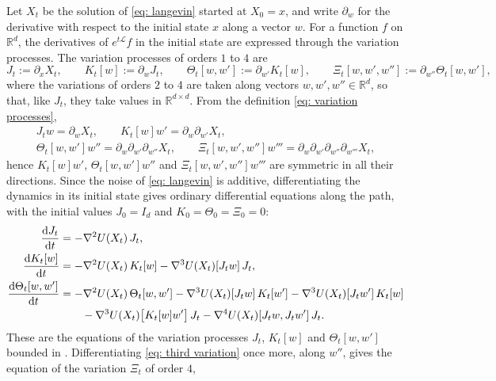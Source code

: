 Let $X_t$ be the solution of \eqref{eq: langevin} started at $X_0 = x$, and write $\partial_w$ for the derivative with respect to the initial state $x$ along a vector $w$. For a function $f$ on $\mathbb R^d$, the derivatives of $e^{t\mathcal L} f$ in the initial state are expressed through the variation processes. The variation processes of orders $1$ to $4$ are
\begin{equation}
    J_t := \partial_x X_t , \qquad
    K_t[w] := \partial_w J_t , \qquad
    \Theta_t[w,w'] := \partial_{w'} K_t[w] , \qquad
    \Xi_t[w,w',w''] := \partial_{w''} \Theta_t[w,w'] ,
    \label{eq: variation processes}
\end{equation}
where the variations of orders $2$ to $4$ are taken along vectors $w, w', w'' \in \mathbb R^d$, so that, like $J_t$, they take values in $\mathbb R^{d \times d}$. From the definition \eqref{eq: variation processes},
\begin{equation*}
\begin{gathered}
    J_t w = \partial_w X_t , \qquad K_t[w] w' = \partial_w \partial_{w'} X_t , \\
    \Theta_t[w,w'] w'' = \partial_w \partial_{w'} \partial_{w''} X_t , \qquad \Xi_t[w,w',w''] w''' = \partial_w \partial_{w'} \partial_{w''} \partial_{w'''} X_t ,
\end{gathered}
\end{equation*}
hence $K_t[w] w'$, $\Theta_t[w,w'] w''$ and $\Xi_t[w,w',w''] w'''$ are symmetric in all their directions. Since the noise of \eqref{eq: langevin} is additive, differentiating the dynamics in its initial state gives ordinary differential equations along the path, with the initial values $J_0 = I_d$ and $K_0 = \Theta_0 = \Xi_0 = 0$:
\begin{align}
    \frac{\mathrm{d} J_t}{\mathrm{d} t} &= -\nabla^2 U(X_t)\, J_t , \label{eq: first variation}\\
    \frac{\mathrm{d} K_t[w]}{\mathrm{d} t} &= -\nabla^2 U(X_t)\, K_t[w] - \nabla^3 U(X_t)[J_t w]\, J_t , \label{eq: second variation}\\
    \frac{\mathrm{d} \Theta_t[w,w']}{\mathrm{d} t} &= -\nabla^2 U(X_t)\, \Theta_t[w,w'] - \nabla^3 U(X_t)[J_t w]\, K_t[w'] - \nabla^3 U(X_t)[J_t w']\, K_t[w] \notag\\
    &\qquad - \nabla^3 U(X_t)\bigl[ K_t[w] w' \bigr]\, J_t - \nabla^4 U(X_t)[J_t w, J_t w']\, J_t . \label{eq: third variation}
\end{align}
These are the equations of the variation processes $J_t$, $K_t[w]$ and $\Theta_t[w,w']$ bounded in \citep[Lemma~6]{ye2026mse}. Differentiating \eqref{eq: third variation} once more, along $w''$, gives the equation of the variation $\Xi_t$ of order $4$,
